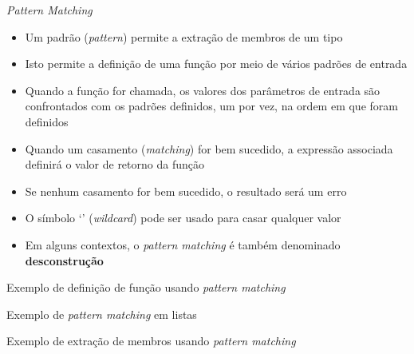 \begin{frame}[fragile]{\it Pattern Matching}

    \begin{itemize}
        \item Um padrão (\textit{pattern}) permite a extração de membros de um tipo

        \item Isto permite a definição de uma função por meio de vários padrões de entrada

        \item Quando a função for chamada, os valores dos parâmetros de entrada são 
            confrontados com os padrões definidos, um por vez, na ordem em que foram definidos

        \item Quando um casamento (\textit{matching}) for bem sucedido, a expressão associada
            definirá o valor de retorno da função

        \item Se nenhum casamento for bem sucedido, o resultado será um erro

        \item O símbolo `' (\textit{wildcard}) pode ser usado para casar qualquer
            valor

        \item Em alguns contextos, o \textit{pattern matching} é também denominado 
            \textbf{desconstrução}
    \end{itemize}

\end{frame}

\begin{frame}[fragile]{Exemplo de definição de função usando {\it pattern matching}}
\end{frame}

\begin{frame}[fragile]{Exemplo de {\it pattern matching} em listas}
\end{frame}

\begin{frame}[fragile]{Exemplo de extração de membros usando {\it pattern matching}}
\end{frame}

